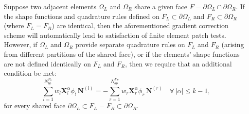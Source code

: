     	Suppose two adjacent elements $\Omega_{L}$ and $\Omega_{R}$ share a given face $F = \partial \Omega_{L} \cap \partial \Omega_{R}$. If the shape functions and quadrature rules defined on $F_L \subset \partial \Omega_L$ and $F_R \subset \partial \Omega_R$ (where $F_L = F_R$) are identical, then the aforementioned gradient correction scheme will automatically lead to satisfaction of finite element patch tests. However, if $\Omega_{L}$ and $\Omega_{R}$ provide separate quadrature rules on $F_L$ and $F_R$ (arising from different partitions of the shared face), or if the elements' shape functions are not defined identically on $F_L$ and $F_R$, then we require that an additional condition be met:
    	\begin{equation}
    		\sum_{l=1}^{N^{F_L}_{bp}} w_l \mathbf{X}^{\alpha}_l \phi_l \, \mathbf{N}^{(l)} = - \sum_{r=1}^{N^{F_R}_{bp}} w_r \mathbf{X}^{\alpha}_r \phi_r \, \mathbf{N}^{(r)} \quad \forall \, | \alpha | \leq k-1,
    		\label{eq:face_constraint}
    	\end{equation}
    	for every shared face $\partial \Omega_L \subset F_L = F_R \subset \partial \Omega_R$.
		
